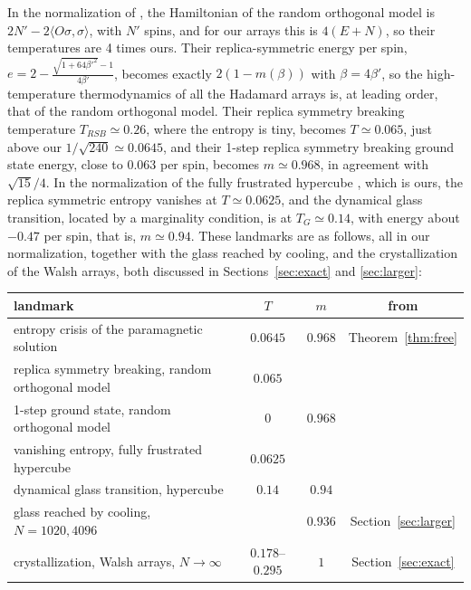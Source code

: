 \documentclass[11pt,a4paper]{article}
\theoremstyle{remark}
\begin{document}
In the normalization of \cite{mp2}, the Hamiltonian of the random orthogonal model is $2N'-2\langle O\sigma,\sigma\rangle$, with $N'$ spins, and for our arrays this is $4(E+N)$, so their temperatures are 4 times ours. Their replica-symmetric energy per spin, $e=2-\frac{\sqrt{1+64\beta'^2}-1}{4\beta'}$, becomes exactly $2(1-m(\beta))$ with $\beta=4\beta'$, so the high-temperature thermodynamics of all the Hadamard arrays is, at leading order, that of the random orthogonal model. Their replica symmetry breaking temperature $T_{RSB}\simeq0.26$, where the entropy is tiny, becomes $T\simeq0.065$, just above our $1/\sqrt{240}\simeq0.0645$, and their 1-step replica symmetry breaking ground state energy, close to $0.063$ per spin, becomes $m\simeq0.968$, in agreement with $\sqrt{15}/4$. In the normalization of the fully frustrated hypercube \cite{mp3}, which is ours, the replica symmetric entropy vanishes at $T\simeq0.0625$, and the dynamical glass transition, located by a marginality condition, is at $T_G\simeq0.14$, with energy about $-0.47$ per spin, that is, $m\simeq0.94$. These landmarks are as follows, all in our normalization, together with the glass reached by cooling, and the crystallization of the Walsh arrays, both discussed in Sections~\ref{sec:exact} and \ref{sec:larger}:

\medskip

\begin{center}
\begin{tabular}{|l|c|c|c|}
\hline
landmark & $T$ & $m$ & from\\
\hline
entropy crisis of the paramagnetic solution & $0.0645$ & $0.968$ & Theorem~\ref{thm:free}\\
replica symmetry breaking, random orthogonal model & $0.065$ & & \cite{mp2}\\
1-step ground state, random orthogonal model & $0$ & $0.968$ & \cite{mp2}\\
vanishing entropy, fully frustrated hypercube & $0.0625$ & & \cite{mp3}\\
dynamical glass transition, hypercube & $0.14$ & $0.94$ & \cite{mp3}\\
glass reached by cooling, $N=1020,4096$ & & $0.936$ & Section~\ref{sec:larger}\\
crystallization, Walsh arrays, $N\to\infty$ & $0.178$--$0.295$ & $1$ & Section~\ref{sec:exact}\\
\hline
\end{tabular}
\end{center}

\medskip
\end{document}
